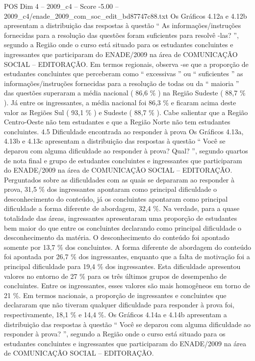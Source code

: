 \begin{textsample}{POS Dim 4 – 2009\_c4 – Score -5.00 – 2009\_c4/enade\_2009\_com\_soc\_edit\_bd87747c88.txt}
Os Gráficos 4.12a e 4.12b apresentam a distribuição das respostas à questão “ As informações/instruções fornecidas para a resolução das questões foram suficientes para resolvê -las? ”, segundo a Região onde o curso está situado para os estudantes concluintes e ingressantes que participaram do ENADE/2009 na área de COMUNICAÇÃO SOCIAL – EDITORAÇÃO.
Em termos regionais, observa -se que a proporção de estudantes concluintes que perceberam como “ excessivas ” ou “ suficientes ” as informações/instruções fornecidas para a resolução de todas ou da “ maioria ” das questões superaram a média nacional ( 86,6 \% ) na Região Sudeste ( 88,7 \% ).
Já entre os ingressantes, a média nacional foi 86,3 \% e ficaram acima deste valor as Regiões Sul ( 93,1 \% ) e Sudeste ( 88,7 \% ).
Cabe salientar que a Região Centro-Oeste não tem estudantes e que a Região Norte não tem estudantes concluintes. 4.5 Dificuldade encontrada ao responder à prova Os Gráficos 4.13a, 4.13b e 4.13c apresentam a distribuição das respostas à questão “ Você se deparou com alguma dificuldade ao responder à prova?
Qual? ”, segundo quartos de nota final e grupo de estudantes concluintes e ingressantes que participaram do ENADE/2009 na área de COMUNICAÇÃO SOCIAL – EDITORAÇÃO.
Perguntados sobre as dificuldades com as quais se depararam ao responder à prova, 31,5 \% dos ingressantes apontaram como principal dificuldade o desconhecimento do conteúdo, já os concluintes apontaram como principal dificuldade a forma diferente de abordagem, 32,4 \%.
Na verdade, para a quase totalidade das áreas, ingressantes apresentaram uma proporção de estudantes bem maior do que entre os concluintes declarando como principal dificuldade o desconhecimento da matéria.
O desconhecimento do conteúdo foi apontado somente por 13,7 \% dos concluintes.
A forma diferente de abordagem do conteúdo foi apontada por 26,7 \% dos ingressantes, enquanto que a falta de motivação foi a principal dificuldade para 19,4 \% dos ingressantes.
Esta dificuldade apresentou valores no entorno de 27 \% para os três últimos grupos de desempenho de concluintes.
Entre os ingressantes, esses valores são mais homogêneos em torno de 21 \%.
Em termos nacionais, a proporção de ingressantes e concluintes que declararam que não tiveram qualquer dificuldade para responder à prova foi, respectivamente, 18,1 \% e 14,4 \%.
Os Gráficos 4.14a e 4.14b apresentam a distribuição das respostas à questão “ Você se deparou com alguma dificuldade ao responder à prova? ”, segundo a Região onde o curso está situado para os estudantes concluintes e ingressantes que participaram do ENADE/2009 na área de COMUNICAÇÃO SOCIAL – EDITORAÇÃO.

\end{textsample}
